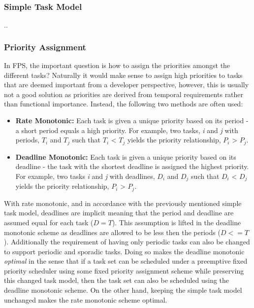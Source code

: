 \subsubsection{Simple Task Model}
..

\subsubsection{Priority Assignment}
In FPS, the important question is how to assign the priorities amongst the different tasks? Naturally it would make sense to assign high priorities to tasks that are deemed important from a developer perspective, however, this is usually not a good solution as priorities are derived from temporal requirements rather than functional importance. Instead, the following two methods are often used:

\begin{itemize}
	\item \textbf{Rate Monotonic:} Each task is given a unique priority based on its period - a short period equals a high priority. For example, two tasks, \textit{i} and \textit{j} with periods, $T_i$ and $T_j$ such that $T_i$ < $T_j$ yields the priority relationship, $P_i$ > $P_j$.
	\item \textbf{Deadline Monotonic:} Each task is given a unique priority based on its deadline - the task with the shortest deadline is assigned the highest priority. For example, two tasks \textit{i} and \textit{j} with deadlines, $D_i$ and $D_j$ such that $D_i$ < $D_j$ yields the priority relationship, $P_i$ > $P_j$.
\end{itemize}

With rate monotonic, and in accordance with the previously mentioned simple task model, deadlines are implicit meaning that the period and deadline are assumed equal for each task ($D = T$). This assumption is lifted in the deadline monotonic scheme as deadlines are allowed to be less then the periods ($D <= T$). Additionally the requirement of having only periodic tasks can also be changed to support periodic and sporadic tasks. Doing so makes the deadline monotonic \textit{optimal} in the sense that if a task set can be scheduled under a preemptive fixed priority scheduler using some fixed priority assignment scheme while preserving this changed task model, then the task set can also be scheduled using the deadline monotonic scheme. On the other hand, keeping the simple task model unchanged makes the rate monotonic scheme optimal.

